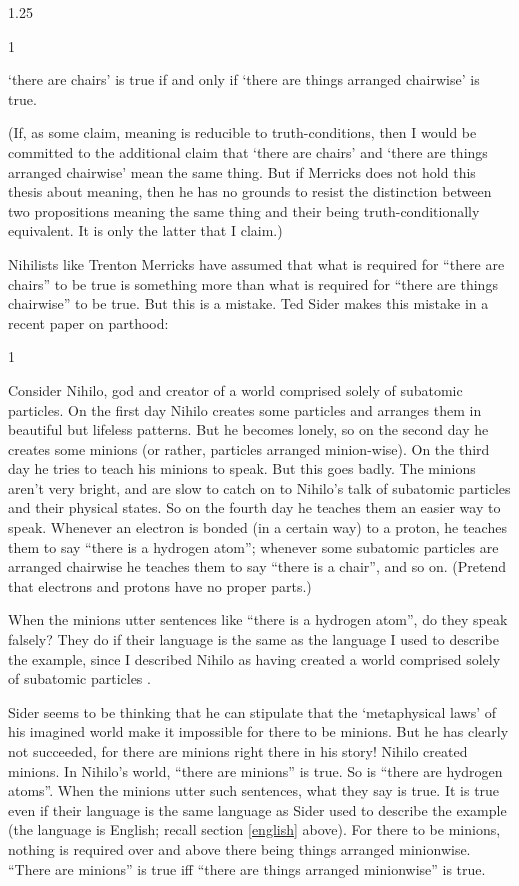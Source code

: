 \documentclass[11pt]{article}
\newenvironment{squote}{%
\begin{spacing}{1}
       	\begin{list}{}{%
\setlength{\labelwidth}{0pt}%
\rightmargin\leftmargin%
}
\item\relax
}{%
\end{list}%
\end{spacing}
}
\begin{document}
\begin{spacing}{1.25}
\begin{squote}
`there are chairs' is true if and only if `there are things arranged
  chairwise' is true.
\end{squote}

(If, as some claim, meaning is reducible to truth-conditions, then I
would be committed to the additional claim that `there are chairs' and
`there are things arranged chairwise' mean the same thing.  But if
Merricks does not hold this thesis about meaning, then he has no
grounds to resist the distinction between two propositions meaning the
same thing and their being truth-conditionally equivalent.  It is only
the latter that I claim.)

Nihilists like Trenton Merricks have assumed that what is required for
``there are chairs'' to be true is something more than what is
required for ``there are things chairwise'' to be true.  But this is a
mistake.  Ted Sider makes this mistake in a recent paper on parthood:

\begin{squote}
Consider Nihilo, god and creator of a world comprised solely of
subatomic particles.  On the first day Nihilo creates some particles
and arranges them in beautiful but lifeless patterns.  But he becomes
lonely, so on the second day he creates some minions (or rather,
particles arranged minion-wise).  On the third day he tries to teach
his minions to speak.  But this goes badly.  The minions aren't very
bright, and are slow to catch on to Nihilo's talk of subatomic
particles and their physical states.  So on the fourth day he teaches
them an easier way to speak.  Whenever an electron is bonded (in a
certain way) to a proton, he teaches them to say ``there is a hydrogen
atom''; whenever some subatomic particles are arranged chairwise he
teaches them to say ``there is a chair'', and so on.  (Pretend that
electrons and protons have no proper parts.)

When the minions utter sentences like ``there is a hydrogen atom'', do
they speak falsely?  They do if their language is the same as the
language I used to describe the example, since I described Nihilo as
having created a world comprised solely of subatomic particles
\citeyearpar[7]{sider2011c}.
\end{squote}

Sider seems to be thinking that he can stipulate that the
`metaphysical laws' of his imagined world make it impossible for there
to be minions.  But he has clearly not succeeded, for there are
minions right there in his story!  Nihilo created minions.  In
Nihilo's world, ``there are minions'' is true.  So is ``there are
hydrogen atoms''.  When the minions utter such sentences, what they
say is true.  It is true even if their language is the same language
as Sider used to describe the example (the language is English; recall
section \ref{english} above).  For there to be minions, nothing is
required over and above there being things arranged minionwise.
``There are minions'' is true iff ``there are things arranged
minionwise'' is true.


\end{spacing}
\end{document}
